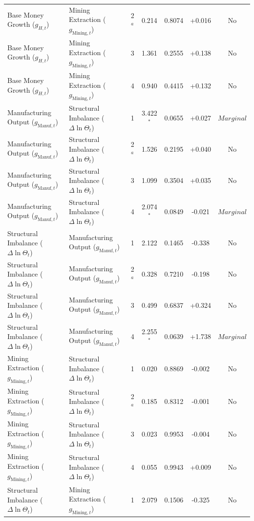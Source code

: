\begin{table}[p]
{\begin{tabular}{llccccc}
Base Money Growth ($g_{H,t}$) & Mining Extraction ($g_{\text{Mining},t}$) & 2$^a$ & 0.214 & 0.8074 & +0.016 & No \\
Base Money Growth ($g_{H,t}$) & Mining Extraction ($g_{\text{Mining},t}$) & 3 & 1.361 & 0.2555 & +0.138 & No \\
Base Money Growth ($g_{H,t}$) & Mining Extraction ($g_{\text{Mining},t}$) & 4 & 0.940 & 0.4415 & +0.132 & No \\
Manufacturing Output ($g_{\text{Manuf},t}$) & Structural Imbalance ($\Delta \ln \Theta_t$) & 1 & 3.422$^{*}$ & 0.0655 & +0.027 & $Marginal$ \\
Manufacturing Output ($g_{\text{Manuf},t}$) & Structural Imbalance ($\Delta \ln \Theta_t$) & 2$^a$ & 1.526 & 0.2195 & +0.040 & No \\
Manufacturing Output ($g_{\text{Manuf},t}$) & Structural Imbalance ($\Delta \ln \Theta_t$) & 3 & 1.099 & 0.3504 & +0.035 & No \\
Manufacturing Output ($g_{\text{Manuf},t}$) & Structural Imbalance ($\Delta \ln \Theta_t$) & 4 & 2.074$^{*}$ & 0.0849 & -0.021 & $Marginal$ \\
Structural Imbalance ($\Delta \ln \Theta_t$) & Manufacturing Output ($g_{\text{Manuf},t}$) & 1 & 2.122 & 0.1465 & -0.338 & No \\
Structural Imbalance ($\Delta \ln \Theta_t$) & Manufacturing Output ($g_{\text{Manuf},t}$) & 2$^a$ & 0.328 & 0.7210 & -0.198 & No \\
Structural Imbalance ($\Delta \ln \Theta_t$) & Manufacturing Output ($g_{\text{Manuf},t}$) & 3 & 0.499 & 0.6837 & +0.324 & No \\
Structural Imbalance ($\Delta \ln \Theta_t$) & Manufacturing Output ($g_{\text{Manuf},t}$) & 4 & 2.255$^{*}$ & 0.0639 & +1.738 & $Marginal$ \\
Mining Extraction ($g_{\text{Mining},t}$) & Structural Imbalance ($\Delta \ln \Theta_t$) & 1 & 0.020 & 0.8869 & -0.002 & No \\
Mining Extraction ($g_{\text{Mining},t}$) & Structural Imbalance ($\Delta \ln \Theta_t$) & 2$^a$ & 0.185 & 0.8312 & -0.001 & No \\
Mining Extraction ($g_{\text{Mining},t}$) & Structural Imbalance ($\Delta \ln \Theta_t$) & 3 & 0.023 & 0.9953 & -0.004 & No \\
Mining Extraction ($g_{\text{Mining},t}$) & Structural Imbalance ($\Delta \ln \Theta_t$) & 4 & 0.055 & 0.9943 & +0.009 & No \\
Structural Imbalance ($\Delta \ln \Theta_t$) & Mining Extraction ($g_{\text{Mining},t}$) & 1 & 2.079 & 0.1506 & -0.325 & No \\

\end{tabular}}
\end{table}
